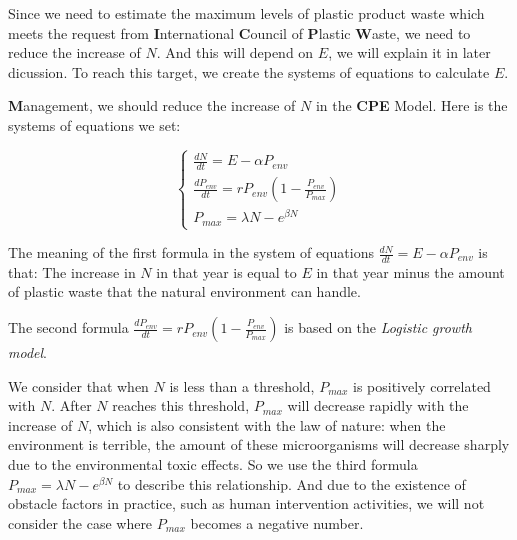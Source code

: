 \documentclass{mcmthesis}
\begin{document}
		Since we need to estimate the maximum levels of plastic product waste which meets the request from \textbf{I}nternational \textbf{C}ouncil of \textbf{P}lastic \textbf{W}aste, we need to reduce the increase of $N$. And this will depend on $E$, we will explain it in later dicussion. To reach this target, we create the systems of equations to calculate $E$.
	   
		\textbf{M}anagement, we should reduce the increase of $N$ in the \textbf{CPE} Model. 
       Here is the systems of equations we set:
	    \begin{spacing}{1.5}
	    \begin{equation}
		  \begin{cases}%
		  \frac{dN}{dt}=E-\alpha P_{env} \\
		  
		  \frac{dP_{env}}{dt}=rP_{env}(1-\frac{P_{env}}{P_{max}})\\
		  P_{max}=\lambda N-e^{\beta N}

		    \end{cases}
	     \end{equation}
		\end{spacing}
	
		The meaning of the first formula in the system of equations  $\frac{dN}{dt}=E-\alpha P_{env}$ is that: The increase in $N$ in that year is equal to $E$ in that year minus the amount of plastic waste that the natural environment can handle.
	   
		The second formula $\frac{dP_{env}}{dt}=rP_{env}(1-\frac{P_{env}}{P_{max}})$ is based on the \textit{Logistic growth model}. 

		We consider that when $N$ is less than a threshold, $P_{max}$ is positively correlated with $N$. After $N$ reaches this threshold, $P_{max}$ will decrease rapidly with the increase of $N$, which is also consistent with the law of nature: when the environment is terrible, the amount of these microorganisms will decrease sharply due to the environmental toxic effects. So we use the third formula $P_{max}=\lambda N-e^{\beta N}$ to describe this relationship. And due to the existence of obstacle factors in practice, such as human intervention activities, we will not consider the case where $P_{max}$ becomes a negative number.
	 
	
\end{document}
